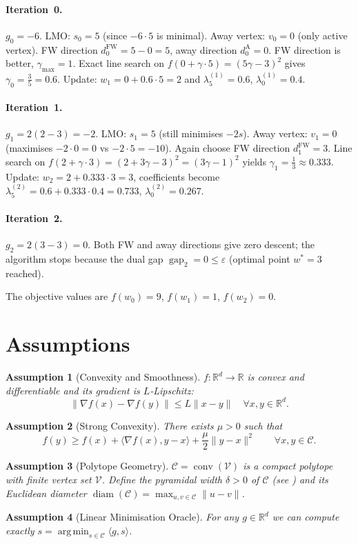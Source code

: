\documentclass{article}
\newtheorem{assumption}{Assumption}
\newcommand{\R}{\mathbb{R}}
\newcommand{\C}{\mathcal{C}}
\newcommand{\gap}{\operatorname{gap}}
\newcommand{\diam}{\operatorname{diam}}
\newcommand{\conv}{\operatorname{conv}}
\newcommand{\argmin}{\operatorname*{arg\,min}}
\begin{document}
\paragraph{Iteration~0.}  
$g_{0}=-6$.  
LMO: $s_{0}=5$ (since $-6\cdot5$ is minimal).  
Away vertex: $v_{0}=0$ (only active vertex).  
FW direction $d^{\text{FW}}_{0}=5-0=5$, away direction $d^{\text{A}}_{0}=0$.  
FW direction is better, $\gamma_{\max}=1$.  
Exact line search on $f(0+\gamma\cdot5)=(5\gamma-3)^{2}$ gives $\gamma_{0}= \frac{3}{5}=0.6$.  
Update: $w_{1}=0+0.6\cdot5=2$ and $\lambda^{(1)}_{5}=0.6$, $\lambda^{(1)}_{0}=0.4$.

\paragraph{Iteration~1.}  
$g_{1}=2(2-3)=-2$.  
LMO: $s_{1}=5$ (still minimises $-2 s$).  
Away vertex: $v_{1}=0$ (maximises $-2\cdot0=0$ vs $-2\cdot5=-10$).  
Again choose FW direction $d^{\text{FW}}_{1}=3$.  
Line search on $f(2+ \gamma\cdot3)=(2+3\gamma-3)^{2}=(3\gamma-1)^{2}$ yields $\gamma_{1}= \frac13\approx0.333$.  
Update: $w_{2}=2+0.333\cdot3=3$, coefficients become $\lambda^{(2)}_{5}=0.6+0.333\cdot0.4=0.733$, $\lambda^{(2)}_{0}=0.267$.

\paragraph{Iteration~2.}  
$g_{2}=2(3-3)=0$. Both FW and away directions give zero descent; the algorithm stops because the dual gap $\gap_{2}=0\le\varepsilon$ (optimal point $w^{*}=3$ reached).

The objective values are $f(w_{0})=9$, $f(w_{1})=1$, $f(w_{2})=0$.

\section*{Assumptions}
\begin{assumption}[Convexity and Smoothness]
\label{ass:convex-smooth}
$f:\R^{d}\rightarrow\R$ is convex and differentiable and its gradient is $L$‑Lipschitz:
\[
\|\nabla f(x)-\nabla f(y)\|\le L\|x-y\|\quad\forall x,y\in\R^{d}.
\]
\end{assumption}
\begin{assumption}[Strong Convexity]
\label{ass:strong}
There exists $\mu>0$ such that
\[
f(y)\ge f(x)+\langle\nabla f(x),y-x\rangle+\frac{\mu}{2}\|y-x\|^{2}\qquad\forall x,y\in\C.
\]
\end{assumption}
\begin{assumption}[Polytope Geometry]
\label{ass:polytope}
$\C=\conv(\mathcal{V})$ is a compact polytope with finite vertex set $\mathcal{V}$.  
Define the \emph{pyramidal width} $\delta>0$ of $\C$ (see \cite{Lacoste-Julien2015}) and its Euclidean diameter $\diam(\C)=\max_{u,v\in\C}\|u-v\|$.
\end{assumption}
\begin{assumption}[Linear Minimisation Oracle]
\label{ass:lmo}
For any $g\in\R^{d}$ we can compute exactly $s=\argmin_{s\in\C}\langle g,s\rangle$.
\end{assumption}
\end{document}
